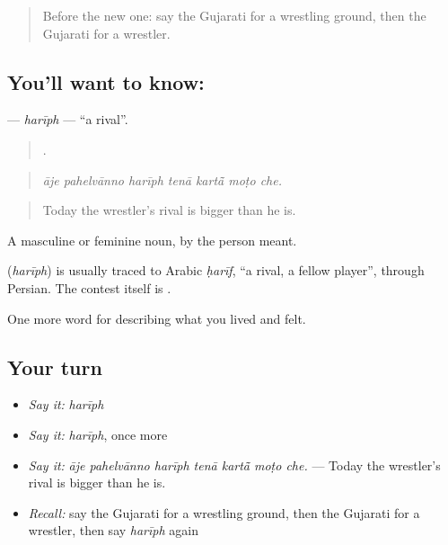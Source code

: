 \begin{quote}
Before the new one: say the Gujarati for a wrestling ground, then the Gujarati for a wrestler.
\end{quote}

\subsection*{You'll want to know: }
\textbf{} — \emph{harīph} — \textquotedblleft{}a rival\textquotedblright{}.

\begin{quote}
      .
\end{quote}

\begin{quote}
\emph{āje pahelvānno harīph tenā kartā̃ moṭo che.}
\end{quote}

\begin{quote}
Today the wrestler's rival is bigger than he is.
\end{quote}

A masculine or feminine noun, by the person meant.

\begin{cousinweb}
\textbf{} (\emph{harīph}) is usually traced to Arabic \emph{ḥarīf}, \textquotedblleft{}a rival, a fellow player\textquotedblright{}, through Persian. The contest itself is \textbf{}.
\end{cousinweb}

\begin{grammarlens}[title={What you've built}]
One more word for describing what you lived and felt.
\end{grammarlens}

\subsection*{Your turn}
\begin{itemize}
\raggedright
  \item \emph{Say it:} \emph{harīph}
  \item \emph{Say it:} \emph{harīph}, once more
  \item \emph{Say it:} \emph{āje pahelvānno harīph tenā kartā̃ moṭo che.} — Today the wrestler's rival is bigger than he is.
  \item \emph{Recall:} say the Gujarati for a wrestling ground, then the Gujarati for a wrestler, then say \emph{harīph} again
\end{itemize}

